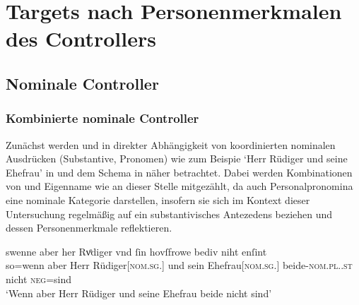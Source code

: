 
\section{Targets nach Personenmerkmalen des Controllers}
\label{sec:caotargpers}

\subsection{Nominale Controller}
\subsubsection{Kombinierte nominale Controller}
\label{subsubsec:perscombsgnp}

Zunächst werden  und  in direkter Abhängigkeit von
koordinierten nominalen Ausdrücken
(Substantive, Pronomen) wie zum Beispie  `Herr Rüdiger und seine Ehefrau' in  und
dem Schema in  näher betrachtet. Dabei werden
Kombinationen von  und Eigenname wie  an dieser Stelle mitgezählt, da auch
Personalpronomina eine nominale Kategorie darstellen,
insofern sie sich im Kontext dieser Untersuchung regelmäßig auf ein
substantivisches Antezedens beziehen und dessen
Personenmerkmale reflektieren.

\begin{exe}
\ex \label{ex:beid2coordncao1}
		\gll swenne aber her Rvͦdiger vnd ſin
			hovſfrowe bediv niht enſint\\
			so=wenn aber Herr Rüdiger[\textsc{nom.sg.\MascM}] und sein
			Ehefrau[\textsc{nom.sg.\FemF}] beide-\textsc{nom.pl.\NeutMF.st} nicht
			\textsc{neg}=sind\\
			\trans `Wenn aber Herr Rüdiger und seine Ehefrau
				beide nicht  sind'
				\parencites(Nr.~3262, Regensburg, 1299)[425,13--14]{cao4}
\end{exe}


